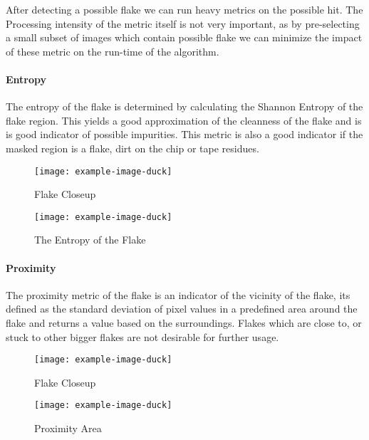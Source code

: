 After detecting a possible flake we can run heavy metrics on the possible hit. The Processing intensity of the metric itself is not very important, as by pre-selecting a small subset of images which contain possible flake we can minimize the impact of these metric on the run-time of the algorithm.
\paragraph{Entropy}
The entropy of the flake is determined by calculating the Shannon Entropy of the flake region. This yields a good approximation of the cleanness of the flake and is is good indicator of possible impurities. This metric is also a good indicator if the masked region is a flake, dirt on the chip or tape residues.\\
\begin{figure}[h!]
\centering
\begin{minipage}{.45\textwidth}
  \centering
  \texttt{[image: example-image-duck]}
  \caption{Flake Closeup}
\end{minipage}
\begin{minipage}{.45\textwidth}

  \centering
  \texttt{[image: example-image-duck]}
    \caption{The Entropy of the Flake}
\end{minipage}
\end{figure}

\paragraph{Proximity}
The proximity metric of the flake is an indicator of the vicinity of the flake, its defined as the standard deviation of pixel values in a predefined area around the flake and returns a value based on the surroundings. Flakes which are close to, or stuck to other bigger flakes are not desirable for further usage.\\
\begin{figure}[h!]
\centering
\begin{minipage}{.45\textwidth}
  \centering
  \texttt{[image: example-image-duck]}
  \caption{Flake Closeup}
\end{minipage}
\begin{minipage}{.45\textwidth}

  \centering
  \texttt{[image: example-image-duck]}
    \caption{Proximity Area}
\end{minipage}
\end{figure}

